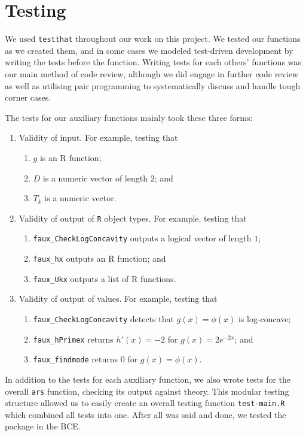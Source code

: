 \documentclass{article}\usepackage[]{graphicx}\usepackage[]{color}
\begin{document}
\section{Testing}

We used \texttt{testthat} throughout our work on this project.
We tested our functions as we created them, and in some cases we modeled
test-driven development by writing the tests before the function.
Writing tests for each others' functions was our main method of code review,
although we did engage in further code review as well as utilising pair programming
to systematically discuss and handle tough corner cases.

The tests for our auxiliary functions mainly took these three forms:
\begin{enumerate}
	\item Validity of input. For example, testing that
	\begin{enumerate}
		\item $g$ is an R function;
		\item $D$ is a numeric vector of length $2$; and
		\item $T_k$ is a numeric vector.
	\end{enumerate}
	\item Validity of output of \texttt{R} object types. For example, testing that
	\begin{enumerate}
		\item \texttt{faux\_CheckLogConcavity} outputs a logical vector of length $1$;
		\item \texttt{faux\_hx} outputs an R function; and
		\item \texttt{faux\_Ukx} outputs a list of R functions.
	\end{enumerate}
	\item Validity of output of values. For example, testing that
	\begin{enumerate}
		\item \texttt{faux\_CheckLogConcavity} detects that $g(x) = \phi(x)$
		is log-concave;
		\item \texttt{faux\_hPrimex} returns $h'(x) = - 2$ for $g(x) = 2e^{-2x}$; and
		\item \texttt{faux\_findmode} returns $0$ for $g(x) = \phi(x)$.
	\end{enumerate}
\end{enumerate}
In addition to the tests for each auxiliary function, we also wrote tests
for the overall \texttt{ars} function, checking its output against theory.
This modular testing structure allowed us to easily create an overall testing
function \texttt{test-main.R} which combined all tests into one.
After all was said and done, we tested the package in the BCE.
\end{document}
